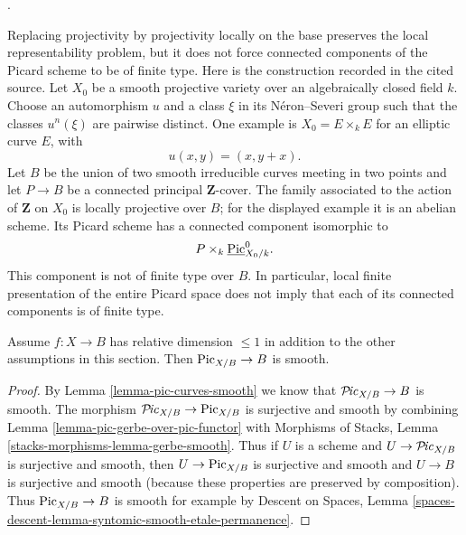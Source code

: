 \begin{remark}
\label{remark-picard-locally-projective-components}
\begin{reference}
\cite[Expos\'e 232, Remark 3.3, pp. 149--150]{FGA}.
\end{reference}
Replacing projectivity by projectivity locally on the base preserves the
local representability problem, but it does not force connected components
of the Picard scheme to be of finite type. Here is the construction recorded
in the cited source. Let $X_0$ be a smooth projective variety over an
algebraically closed field $k$. Choose an automorphism $u$ and a class
$\xi$ in its N\'eron--Severi group such that the classes $u^n(\xi)$ are
pairwise distinct. One example is $X_0 = E \times_k E$ for an elliptic curve
$E$, with
$$
u(x, y) = (x, y + x).
$$
Let $B$ be the union of two smooth irreducible curves meeting in two points
and let $P \to B$ be a connected principal $\mathbf{Z}$-cover. The family
associated to the action of $\mathbf{Z}$ on $X_0$ is locally projective over
$B$; for the displayed example it is an abelian scheme. Its Picard scheme has
a connected component isomorphic to
$$
P \times_k \underline{\mathrm{Pic}}^{0}_{X_0/k}.
$$
This component is not of finite type over $B$. In particular, local finite
presentation of the entire Picard space does not imply that each of its
connected components is of finite type.
\end{remark}

\begin{lemma}
\label{lemma-pic-functor-curves-smooth}
Assume $f : X \to B$ has relative dimension $\leq 1$ in addition to
the other assumptions in this section. Then $\mathrm{Pic}_{X/B} \to B$
is smooth.
\end{lemma}

\begin{proof}
By Lemma \ref{lemma-pic-curves-smooth} we know that
$\mathcal{P}\!\mathit{ic}_{X/B} \to B$ is smooth. The morphism
$\mathcal{P}\!\mathit{ic}_{X/B} \to \mathrm{Pic}_{X/B}$ is surjective
and smooth by combining Lemma \ref{lemma-pic-gerbe-over-pic-functor} with
Morphisms of Stacks, Lemma \ref{stacks-morphisms-lemma-gerbe-smooth}.
Thus if $U$ is a scheme and $U \to \mathcal{P}\!\mathit{ic}_{X/B}$ is surjective
and smooth, then $U \to \mathrm{Pic}_{X/B}$ is surjective and smooth
and $U \to B$ is surjective and smooth (because these properties
are preserved by composition). Thus $\mathrm{Pic}_{X/B} \to B$
is smooth for example by
Descent on Spaces, Lemma
\ref{spaces-descent-lemma-syntomic-smooth-etale-permanence}.
\end{proof}






